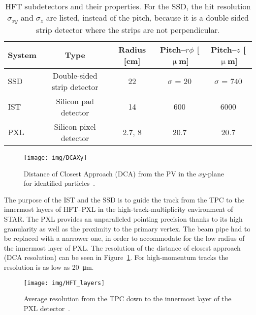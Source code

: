 \begin{table}[htb]
\caption{\label{HFTtab}HFT subdetectors and their properties. For the SSD, the hit resolution $\sigma_{xy}$ and $\sigma_z$ are listed, instead of the pitch, because it is a double sided strip detector where the strips are not perpendicular.}
\begin{center}
\begin{tabular}{lcccc}
\toprule
System & Type & Radius [cm] & Pitch--$r\phi$ [$\upmu$m] & Pitch--$z$ [$\upmu$m]\\
\midrule
SSD & Double-sided strip detector & 22 & $\sigma$ = 20 & $\sigma$ = 740 \\
IST & Silicon pad detector & 14 & 600 & 6000 \\
PXL & Silicon pixel detector & 2.7, 8 & 20.7 & 20.7 \\
\bottomrule
\end{tabular}
\end{center}
\end{table}  



\begin{figure}[!htb]
\begin{center}
 \texttt{[image: img/DCAXy]}\\
\end{center}
\caption{\label{DCA}Distance of Closest Approach (DCA) from the PV in the $xy$-plane for identified particles~\cite{D0v2paper}.}
\end{figure}

The purpose of the IST and the SSD is to guide the track from the TPC to the innermost layers of HFT--PXL in the high-track-multiplicity environment of STAR. The PXL provides an unparalleled pointing precision thanks to its high granularity as well as the proximity to the primary vertex. The beam pipe had to be replaced with a narrower one, in order to accommodate for the low radius of the innermost layer of PXL\@. The resolution of the distance of closest approach (DCA resolution) can be seen in Figure~\ref{DCA}. For high-momentum tracks the resolution is as low as \SI{20}{\micro\metre}.

\begin{figure}[!htb]
\begin{center}
 \texttt{[image: img/HFT\_layers]}\\
\end{center}
\caption{\label{HFT_layers}Average resolution from the TPC down to the innermost layer of the PXL detector~\cite{KubaVyzkumak}.}
\end{figure}

